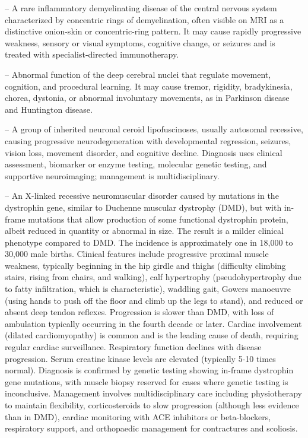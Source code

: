 -- A rare inflammatory demyelinating disease of the central nervous system characterized by concentric rings of demyelination, often visible on MRI as a distinctive onion-skin or concentric-ring pattern. It may cause rapidly progressive weakness, sensory or visual symptoms, cognitive change, or seizures and is treated with specialist-directed immunotherapy.

-- Abnormal function of the deep cerebral nuclei that regulate movement, cognition, and procedural learning. It may cause tremor, rigidity, bradykinesia, chorea, dystonia, or abnormal involuntary movements, as in Parkinson disease and Huntington disease.

-- A group of inherited neuronal ceroid lipofuscinoses, usually autosomal recessive, causing progressive neurodegeneration with developmental regression, seizures, vision loss, movement disorder, and cognitive decline. Diagnosis uses clinical assessment, biomarker or enzyme testing, molecular genetic testing, and supportive neuroimaging; management is multidisciplinary.

-- An X-linked recessive neuromuscular disorder caused by mutations in the dystrophin gene, similar to Duchenne muscular dystrophy (DMD), but with in-frame mutations that allow production of some functional dystrophin protein, albeit reduced in quantity or abnormal in size. The result is a milder clinical phenotype compared to DMD. The incidence is approximately one in 18,000 to 30,000 male births. Clinical features include progressive proximal muscle weakness, typically beginning in the hip girdle and thighs (difficulty climbing stairs, rising from chairs, and walking), calf hypertrophy (pseudohypertrophy due to fatty infiltration, which is characteristic), waddling gait, Gowers manoeuvre (using hands to push off the floor and climb up the legs to stand), and reduced or absent deep tendon reflexes. Progression is slower than DMD, with loss of ambulation typically occurring in the fourth decade or later. Cardiac involvement (dilated cardiomyopathy) is common and is the leading cause of death, requiring regular cardiac surveillance. Respiratory function declines with disease progression. Serum creatine kinase levels are elevated (typically 5-10 times normal). Diagnosis is confirmed by genetic testing showing in-frame dystrophin gene mutations, with muscle biopsy reserved for cases where genetic testing is inconclusive. Management involves multidisciplinary care including physiotherapy to maintain flexibility, corticosteroids to slow progression (although less evidence than in DMD), cardiac monitoring with ACE inhibitors or beta-blockers, respiratory support, and orthopaedic management for contractures and scoliosis.

